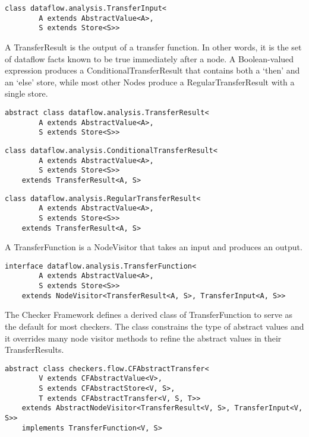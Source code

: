     \begin{verbatim}class dataflow.analysis.TransferInput<
        A extends AbstractValue<A>,
        S extends Store<S>>\end{verbatim}

\label{sec:transfer_result_classes}

    A TransferResult is the output of a transfer function.  In other words, it is the set of dataflow facts known to be true immediately after a node.  A Boolean-valued expression produces a ConditionalTransferResult that contains both a `then' and an `else' store, while most other Nodes produce a RegularTransferResult with a single store.

    \begin{verbatim}abstract class dataflow.analysis.TransferResult<
        A extends AbstractValue<A>,
        S extends Store<S>>\end{verbatim}
        
    \begin{verbatim}class dataflow.analysis.ConditionalTransferResult<
        A extends AbstractValue<A>,
        S extends Store<S>>
    extends TransferResult<A, S>\end{verbatim}

    \begin{verbatim}class dataflow.analysis.RegularTransferResult<
        A extends AbstractValue<A>,
        S extends Store<S>>
    extends TransferResult<A, S>\end{verbatim}

\label{sec:transfer_function_classes}

    A TransferFunction is a NodeVisitor that takes an input and produces an output.

    \begin{verbatim}interface dataflow.analysis.TransferFunction<
        A extends AbstractValue<A>,
        S extends Store<S>>
    extends NodeVisitor<TransferResult<A, S>, TransferInput<A, S>>\end{verbatim}

    The Checker Framework defines a derived class of TransferFunction to serve as the default for most checkers.  The class constrains the type of abstract values and it overrides many node visitor methods to refine the abstract values in their TransferResults.

    \begin{verbatim}abstract class checkers.flow.CFAbstractTransfer<
        V extends CFAbstractValue<V>,
        S extends CFAbstractStore<V, S>,
        T extends CFAbstractTransfer<V, S, T>>
    extends AbstractNodeVisitor<TransferResult<V, S>, TransferInput<V, S>>
    implements TransferFunction<V, S>\end{verbatim}

